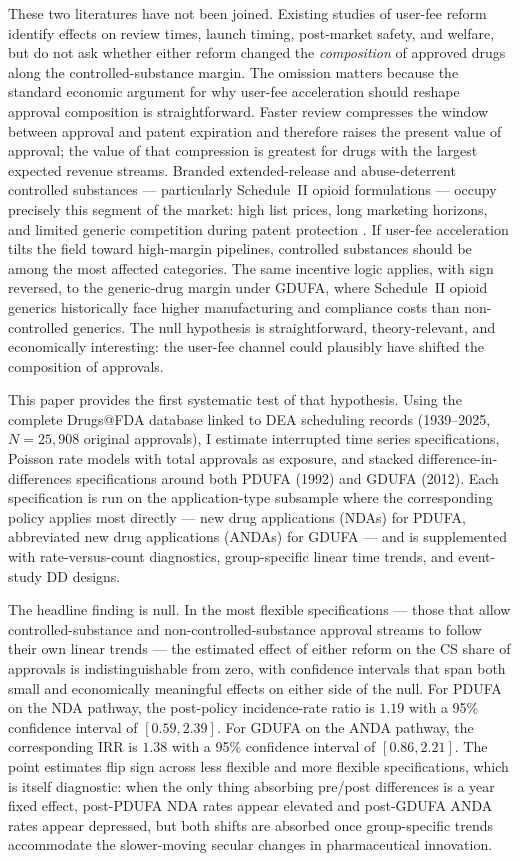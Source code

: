 These two literatures have not been joined. Existing studies of user-fee reform identify effects on review times, launch timing, post-market safety, and welfare, but do not ask whether either reform changed the \textit{composition} of approved drugs along the controlled-substance margin. The omission matters because the standard economic argument for why user-fee acceleration should reshape approval composition is straightforward. Faster review compresses the window between approval and patent expiration and therefore raises the present value of approval; the value of that compression is greatest for drugs with the largest expected revenue streams. Branded extended-release and abuse-deterrent controlled substances --- particularly Schedule~II opioid formulations --- occupy precisely this segment of the market: high list prices, long marketing horizons, and limited generic competition during patent protection \parencite{powellHowIncreasingMedical2020}. If user-fee acceleration tilts the field toward high-margin pipelines, controlled substances should be among the most affected categories. The same incentive logic applies, with sign reversed, to the generic-drug margin under GDUFA, where Schedule~II opioid generics historically face higher manufacturing and compliance costs than non-controlled generics. The null hypothesis is straightforward, theory-relevant, and economically interesting: the user-fee channel could plausibly have shifted the composition of approvals.

This paper provides the first systematic test of that hypothesis. Using the complete Drugs@FDA database linked to DEA scheduling records (1939--2025, $N = 25{,}908$ original approvals), I estimate interrupted time series specifications, Poisson rate models with total approvals as exposure, and stacked difference-in-differences specifications around both PDUFA (1992) and GDUFA (2012). Each specification is run on the application-type subsample where the corresponding policy applies most directly --- new drug applications (NDAs) for PDUFA, abbreviated new drug applications (ANDAs) for GDUFA --- and is supplemented with rate-versus-count diagnostics, group-specific linear time trends, and event-study DD designs.

The headline finding is null. In the most flexible specifications --- those that allow controlled-substance and non-controlled-substance approval streams to follow their own linear trends --- the estimated effect of either reform on the CS share of approvals is indistinguishable from zero, with confidence intervals that span both small and economically meaningful effects on either side of the null. For PDUFA on the NDA pathway, the post-policy incidence-rate ratio is $1.19$ with a 95\% confidence interval of $[0.59, 2.39]$. For GDUFA on the ANDA pathway, the corresponding IRR is $1.38$ with a 95\% confidence interval of $[0.86, 2.21]$. The point estimates flip sign across less flexible and more flexible specifications, which is itself diagnostic: when the only thing absorbing pre/post differences is a year fixed effect, post-PDUFA NDA rates appear elevated and post-GDUFA ANDA rates appear depressed, but both shifts are absorbed once group-specific trends accommodate the slower-moving secular changes in pharmaceutical innovation.

